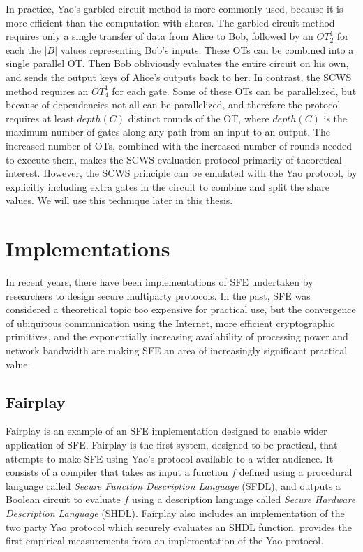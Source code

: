 In practice, Yao's garbled circuit method is more commonly used, because
it is more efficient than the computation with shares. The garbled
circuit method requires only a single transfer of data from Alice
to Bob, followed by an $OT_{2}^{1}$ for each the $|B|$ values representing
Bob's inputs. These OTs can be combined into a single parallel OT.
Then Bob obliviously evaluates the entire circuit on his own, and
sends the output keys of Alice's outputs back to her. In contrast,
the SCWS method requires an $OT_{4}^{1}$ for each gate. Some of these
OTs can be parallelized, but because of dependencies not all can be
parallelized, and therefore the protocol requires at least $depth(C)$
distinct rounds of the OT, where $depth(C)$ is the maximum number
of gates along any path from an input to an output. The increased
number of OTs, combined with the increased number of rounds needed
to execute them, makes the SCWS evaluation protocol primarily of theoretical
interest. However, the SCWS principle can be emulated with the Yao
protocol, by explicitly including extra gates in the circuit to combine
and split the share values. We will use this technique later in this
thesis.


\section{Implementations}

In recent years, there have been implementations of SFE undertaken
by researchers to design secure multiparty protocols. In the past,
SFE was considered a theoretical topic too expensive for practical
use, but the convergence of ubiquitous communication using the Internet,
more efficient cryptographic primitives, and the exponentially increasing
availability of processing power and network bandwidth are making
SFE an area of increasingly significant practical value.


\subsection{Fairplay}

Fairplay \cite{Fairplay} is an example of an SFE implementation designed
to enable wider application of SFE. Fairplay is the first system,
designed to be practical, that attempts to make SFE using Yao's protocol
available to a wider audience. It consists of a compiler that takes
as input a function $f$ defined using a procedural language called
\emph{Secure Function Description Language} (SFDL), and outputs a
Boolean circuit to evaluate $f$ using a description language called
\emph{Secure Hardware Description Language} (SHDL). Fairplay also
includes an implementation of the two party Yao protocol which securely
evaluates an SHDL function. \cite{Fairplay} provides the first empirical
measurements from an implementation of the Yao protocol.


